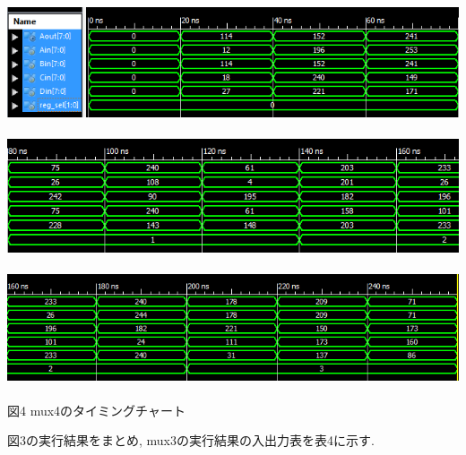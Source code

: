 \documentclass[12pt]{jreport}
\begin{document}
        \begin{center}
            \includegraphics[width=18cm]{mux4_1.png} \\　\\
            \includegraphics[width=18cm]{mux4_2.png} \\　\\
            \includegraphics[width=18cm]{mux4_3.png} \\　\\
                図4 mux4のタイミングチャート
        \end{center} 
        \newpage
        図3の実行結果をまとめ, mux3の実行結果の入出力表を表4に示す. 
\end{document}
